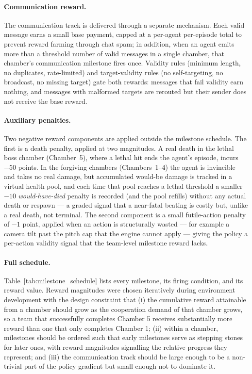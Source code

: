 \paragraph{Communication reward.}
The communication track is delivered through a separate mechanism. Each valid message earns a small base payment, capped at a per-agent per-episode total to prevent reward farming through chat spam; in addition, when an agent emits more than a threshold number of valid messages in a single chamber, that chamber's communication milestone fires once. Validity rules (minimum length, no duplicates, rate-limited) and target-validity rules (no self-targeting, no broadcast, no missing target) gate both rewards: messages that fail validity earn nothing, and messages with malformed targets are rerouted but their sender does not receive the base reward.

\paragraph{Auxiliary penalties.}
Two negative reward components are applied outside the milestone schedule. The first is a death penalty, applied at two magnitudes. A real death in the lethal boss chamber (Chamber~5), where a lethal hit ends the agent's episode, incurs $-50$ points. In the forgiving chambers (Chambers~1--4) the agent is invincible and takes no real damage, but accumulated would-be damage is tracked in a virtual-health pool, and each time that pool reaches a lethal threshold a smaller $-10$ \emph{would-have-died} penalty is recorded (and the pool refills) without any actual death or respawn --- a graded signal that a near-fatal beating is costly but, unlike a real death, not terminal. The second component is a small futile-action penalty of $-1$ point, applied when an action is structurally wasted --- for example a camera tilt past the pitch cap that the engine cannot apply --- giving the policy a per-action validity signal that the team-level milestone reward lacks.

\paragraph{Full schedule.}
Table~\ref{tab:milestone_schedule} lists every milestone, its firing condition, and its reward value. Reward magnitudes were chosen iteratively during environment development with the design constraint that (i) the cumulative reward attainable from a chamber should grow as the cooperation demand of that chamber grows, so a team that successfully completes Chamber 5 receives substantially more reward than one that only completes Chamber 1; (ii) within a chamber, milestones should be ordered such that early milestones serve as stepping stones for later ones, with reward magnitudes signalling the relative progress they represent; and (iii) the communication track should be large enough to be a non-trivial part of the policy gradient but small enough not to dominate it.

